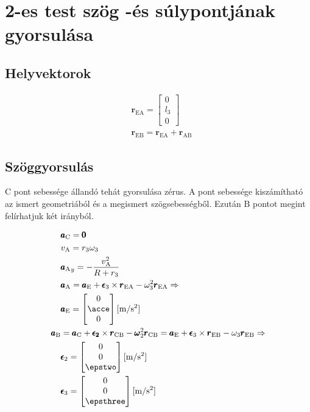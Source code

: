 \section{2-es test szög -és súlypontjának gyorsulása}

\subsection{Helyvektorok}
\begin{align}
	&\pmb{r}_\text{EA} = 
	\begin{bmatrix}
		0 \\ l_3 \\ 0
	\end{bmatrix} \\
	&\pmb{r}_\text{EB} = \pmb{r}_\text{EA} + \pmb{r}_\text{AB}
\end{align}

\subsection{Szöggyorsulás}
$\text{C}$ pont sebessége állandó tehát gyorsulása zérus. $\text{A}$ pont sebessége kiszámítható az ismert geometriából és a megismert szögsebességből. Ezután $\text{B}$ pontot megint felírhatjuk két irányból.

\begin{align}
	&\pmb{a}_\text{C} = \pmb{0} \\
	&v_\text{A} = r_3\omega_3 \\
	&{\pmb{a}_\text{A}}_y = - \frac{v_\text{A}^2}{R+r_3} \\
	&\pmb{a}_\text{A} = \pmb{a}_\text{E} + \pmb{\epsilon}_3 \times \pmb{r}_\text{EA} - \omega_3^2\pmb{r}_\text{EA} \Rightarrow \\
	&\pmb{a}_\text{E} =
	\begin{bmatrix}
		0 \\ \acce \\ 0
	\end{bmatrix} \siunit{}{\meter\per\second^2} \\
	\pmb{a}_\text{B} 
	&= \pmb{a}_\text{C} + \pmb{\epsilon_2} \times \pmb{r}_\text{CB} - \pmb{\omega}_2^2\pmb{r}_\text{CB}
	= \pmb{a}_\text{E} + \pmb{\epsilon}_3 \times \pmb{r}_\text{EB} - \omega_3\pmb{r}_\text{EB} \Rightarrow\\
	&\pmb{\epsilon}_2 =
	\begin{bmatrix}
		0 \\ 0 \\ \epstwo
	\end{bmatrix} \siunit{}{\m\per\second^2}\\
	&\pmb{\epsilon}_3 =
	\begin{bmatrix}
		0 \\ 0 \\ \epsthree
	\end{bmatrix} \siunit{}{\m\per\second^2}\\
\end{align}

